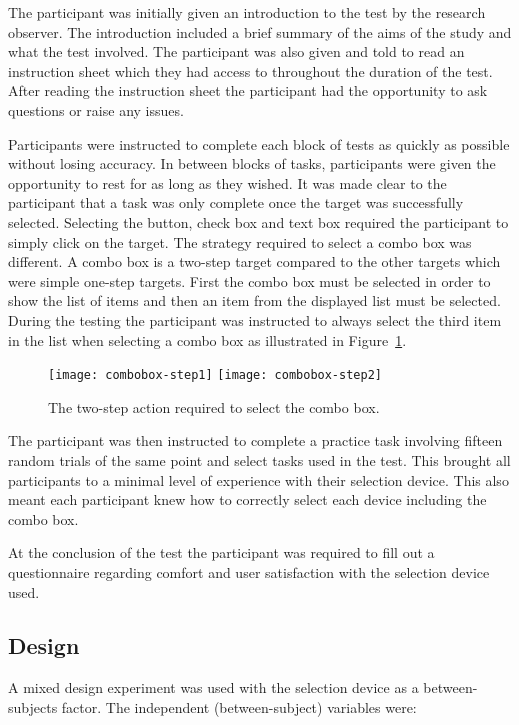 \documentclass{elsart}
\begin{document}
The participant was initially given an introduction to the test by the
research observer. The introduction included a brief summary of the aims
of the study and what the test involved. The participant was also given
and told to read an instruction sheet which they had access to
throughout the duration of the test. After reading the instruction sheet
the participant had the opportunity to ask questions or raise any
issues.

Participants were instructed to complete each block of tests as quickly
as possible without losing accuracy. In between blocks of tasks,
participants were given the opportunity to rest for as long as they
wished. It was made clear to the participant that a task was only
complete once the target was successfully selected. Selecting the
button, check box and text box required the participant to simply click
on the target. The strategy required to select a combo box was
different. A combo box is a two-step target compared to the other
targets which were simple one-step targets. First the combo box must be
selected in order to show the list of items and then an item from the
displayed list must be selected. During the testing the participant was
instructed to always select the third item in the list when selecting a
combo box as illustrated in Figure~\ref{fig-combo-box}.

\begin{figure}
	\centering
	\texttt{[image: combobox-step1]}\quad
	\texttt{[image: combobox-step2]}
	\caption{The two-step action required to select the combo box.}
	\label{fig-combo-box}
\end{figure}

The participant was then instructed to complete a practice task
involving fifteen random trials of the same point and select tasks used
in the test. This brought all participants to a minimal level of
experience with their selection device. This also meant each participant
knew how to correctly select each device including the combo box.

At the conclusion of the test the participant was required to fill out a
questionnaire regarding comfort and user satisfaction with the selection
device used.

\subsection{Design}
\label{sec-method-design}

A mixed design experiment was used with the selection device as a
between-subjects factor. The independent (between-subject) variables
were:
\end{document}
